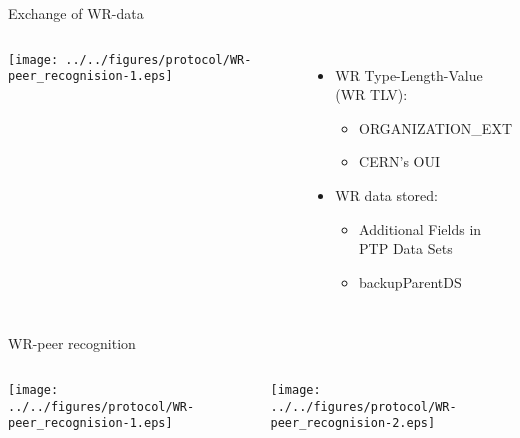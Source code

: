 \documentclass[compress,red]{beamer}
\begin{document}
\begin{frame}{Exchange of WR-data}

  \begin{columns}[c]

    \begin{center}
    \texttt{[image: ../../figures/protocol/WR-peer\_recognision-1.eps]}
    \end{center}


      \begin{itemize}
	\item WR Type-Length-Value (WR TLV):
	  \begin{itemize}
	    \item ORGANIZATION\_EXT
	    \item CERN's OUI
	  \end{itemize}
 	\vspace{0.5cm}
	\item WR data stored:
	  \begin{itemize}
	    \item Additional Fields in PTP Data Sets
	    \item backupParentDS
	  \end{itemize}
      \end{itemize}

  \end{columns}


\end{frame}
\begin{frame}{WR-peer recognition}

  \begin{columns}[c]

    \begin{center}
    \texttt{[image: ../../figures/protocol/WR-peer\_recognision-1.eps]}
    \end{center}


    \begin{center}
    \texttt{[image: ../../figures/protocol/WR-peer\_recognision-2.eps]}
    \end{center}

  \end{columns}

\end{frame}
\end{document}
